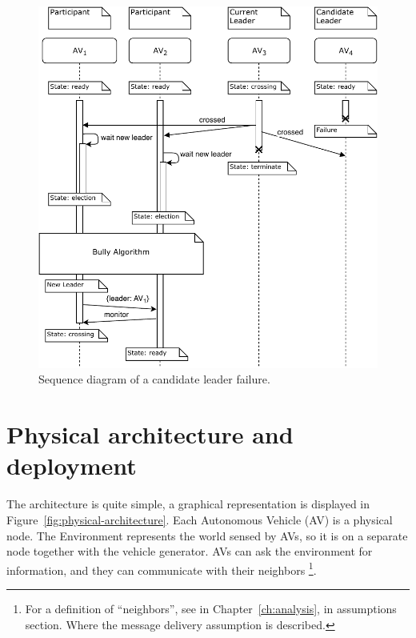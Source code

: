 \documentclass{memoir}
\begin{document}
\begin{figure}
	\centering
	\includegraphics[width=\linewidth]{sequence_diagrams/candidate_failure.pdf}
	\caption{Sequence diagram of a candidate leader failure.}
	\label{fig:seq-diag-candidate-failure}
\end{figure}

\section{Physical architecture and deployment}
The architecture is quite simple, a graphical representation is displayed in Figure~\ref{fig:physical-architecture}. Each Autonomous Vehicle (AV) is a physical node. The Environment represents the world sensed by AVs, so it is on a separate node together with the vehicle generator. AVs can ask the environment for information, and they can communicate with their neighbors \footnote{For a definition of ``neighbors'', see in Chapter~\ref{ch:analysis}, in assumptions section. Where the message delivery assumption is described.}.
\end{document}
